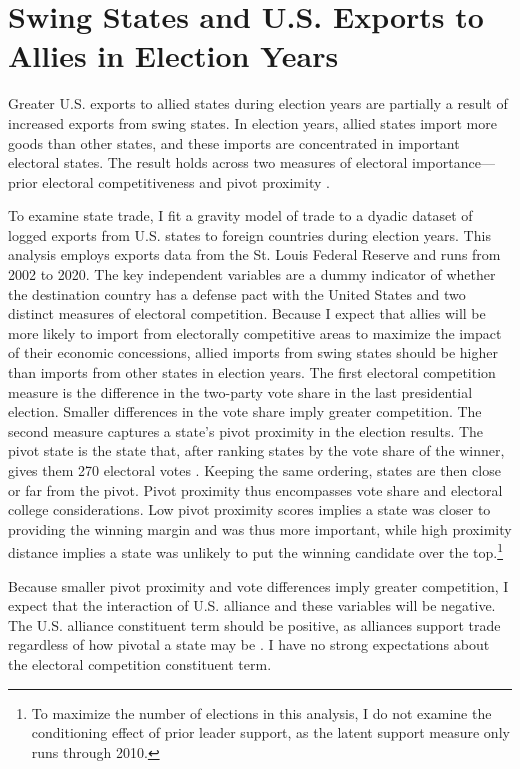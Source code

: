 \documentclass[12pt]{article}
\begin{document}
\section{Swing States and U.S. Exports to Allies in Election Years}


Greater U.S. exports to allied states during election years are partially a result of increased exports from swing states.
In election years, allied states import more goods than other states, and these imports are concentrated in important electoral states.
The result holds across two measures of electoral importance--- prior electoral competitiveness and pivot proximity \citep{Wright2009}.


To examine state trade, I fit a gravity model of trade to a dyadic dataset of logged exports from U.S. states to foreign countries during election years.
This analysis employs exports data from the St. Louis Federal Reserve and runs from 2002 to 2020.
The key independent variables are a dummy indicator of whether the destination country has a defense pact with the United States and two distinct measures of electoral competition. 
Because I expect that allies will be more likely to import from electorally competitive areas to maximize the impact of their economic concessions, allied imports from swing states should be higher than imports from other states in election years. 
The first electoral competition measure is the difference in the two-party vote share in the last presidential election.
Smaller differences in the vote share imply greater competition.
The second measure captures a state's pivot proximity in the election results. 
The pivot state is the state that, after ranking states by the vote share of the winner, gives them 270 electoral votes \citep{Wright2009}.
Keeping the same ordering, states are then close or far from the pivot. 
Pivot proximity thus encompasses vote share and electoral college considerations. 
Low pivot proximity scores implies a state was closer to providing the winning margin and was thus more important, while high proximity distance implies a state was unlikely to put the winning candidate over the top.\footnote{To maximize the number of elections in this analysis, I do not examine the conditioning effect of prior leader support, as the latent support measure only runs through 2010.} 


Because smaller pivot proximity and vote differences imply greater competition, I expect that the interaction of U.S. alliance and these variables will be negative. 
The U.S. alliance constituent term should be positive, as alliances support trade regardless of how pivotal a state may be \citep{GowaMansfield2004, Fordham2010}. 
I have no strong expectations about the electoral competition constituent term.
\end{document}
